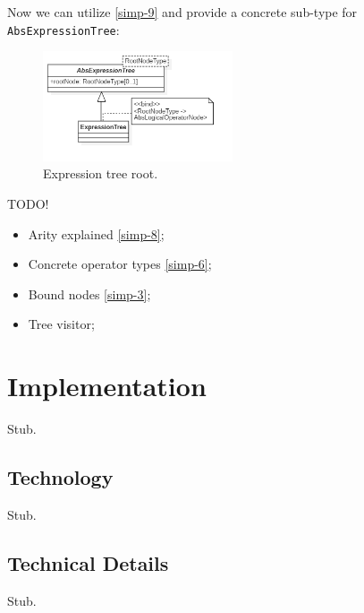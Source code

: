 \documentclass[12pt,oneside,a4paper,notitlepage]{report}
\begin{document}
	\par Now we can utilize \ref{simp-9} and provide a concrete sub-type for \texttt{AbsExpressionTree}:

	\begin{figure}[h]
		\begin{center}
			\includegraphics[width=0.5\textwidth]
			{Models/ExpressionTreeModelFragment}
		\end{center}
		\caption{Expression tree root.}
		\label{fig:expression-tree-model-fragment}
	\end{figure}

	\newpage

	\par TODO!
	\begin{itemize}
		\item Arity explained \ref{simp-8};
		\item Concrete operator types \ref{simp-6};
		\item Bound nodes \ref{simp-3};
		\item Tree visitor;
	\end{itemize}

	\section*{Implementation}
	\par Stub.

	\subsection*{Technology}
	\par Stub.

	\subsection*{Technical Details}
	\par Stub.

	\printbibliography[
		title=Sources
	]
\end{document}
